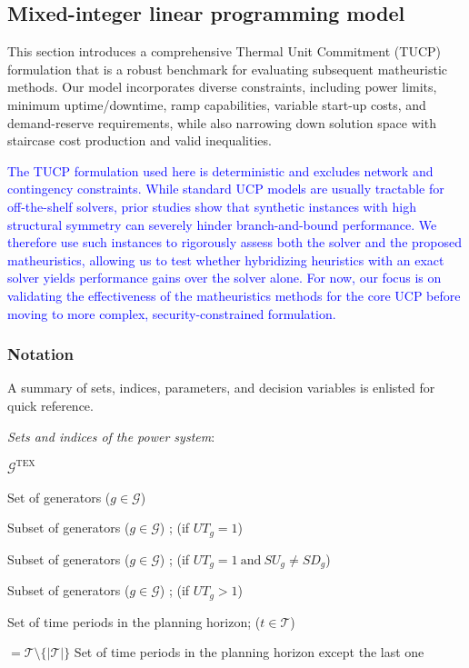 \subsection{Mixed-integer linear programming model
}
This section introduces a comprehensive Thermal Unit Commitment (TUCP) formulation that is a robust benchmark for evaluating subsequent matheuristic methods. Our model incorporates diverse constraints, including power limits, minimum uptime/downtime, ramp capabilities, variable start-up costs, and demand-reserve requirements, while also narrowing down solution space with staircase cost production and valid inequalities. 

\textcolor{blue}{The TUCP formulation used here is deterministic and excludes network and contingency constraints. While standard UCP models are usually tractable for off-the-shelf solvers, prior studies \citep{CarrionArroyo2006,Morales-Espania2013,Ostrowski2012} show that synthetic instances with high structural symmetry can severely hinder branch-and-bound performance. We therefore use such instances to rigorously assess both the solver and the proposed matheuristics, allowing us to test whether hybridizing heuristics with an exact solver yields performance gains over the solver alone. For now, our focus is on validating the effectiveness of the matheuristics methods for the core UCP before moving to more complex, security-constrained formulation.}


\subsubsection*{Notation}
A summary of sets, indices, parameters, and decision variables is enlisted for quick reference.

\vspace{1em}
\noindent\textit{Sets and indices of the power system}:%
\begin{labeling}{$\mathcal{G}^{\text{TEX}}$}
\setlength\itemsep{0.1em}
\item[$\mathcal{G}$] Set of generators ($g\in\mathcal{G}$)
\item[$\mathcal{G}^{1}$]  Subset of generators ($g\in\mathcal{G}$) ; (if $UT_{g}=1$)
\item[$\mathcal{G}^{1*}$] Subset of generators ($g\in\mathcal{G}$) ; (if $UT_{g}=1 \ \text{and} \ \textit{SU}_{g} \neq \textit{SD}_{g} $)
\item[$\mathcal{G}^{>1}$] Subset of generators ($g\in\mathcal{G}$) ; (if $UT_{g}>1$)
\item[$\mathcal{T}$] Set of time periods in the planning horizon;  ($t\in \mathcal{T}$)
\item[$\mathcal{T}^0$] $=\mathcal{T} \setminus \{ |\mathcal{T}| \}$ Set of time periods in the planning horizon except the last one
\end{labeling}


